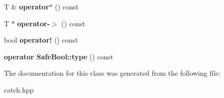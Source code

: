 \begin{DoxyCompactItemize}
T \& {\bfseries operator$\ast$} () const
\item 
\mbox{\label{class_catch_1_1_ptr_acc0996cbd99f360069260a898b3f4fda}} 
T $\ast$ {\bfseries operator-\/$>$} () const
\item 
\mbox{\label{class_catch_1_1_ptr_a85c4fe6cebf2a69d0416020b65714360}} 
bool {\bfseries operator!} () const
\item 
\mbox{\label{class_catch_1_1_ptr_a102838cb25643586679e12efca26a3af}} 
{\bfseries operator Safe\+Bool\+::type} () const
\end{DoxyCompactItemize}


The documentation for this class was generated from the following file\+:\begin{DoxyCompactItemize}
\item 
catch.\+hpp\end{DoxyCompactItemize}
